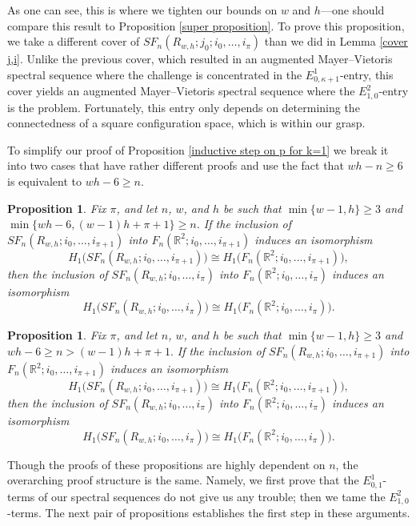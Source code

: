 \documentclass[pagebackref,colorlinks,citecolor=blue,linkcolor=blue,urlcolor=blue,filecolor=blue]{article}
\newtheorem{prop}[thm]{Proposition}
\theoremstyle{definition}\newtheorem{definition}[thm]{Definition}
\theoremstyle{definition}
\newcommand{\R}{\ensuremath{\mathbb{R}}}
\begin{document}
As one can see, this is where we tighten our bounds on $w$ and $h$---one should compare this result to Proposition \ref{super proposition}.
To prove this proposition, we take a different cover of $SF_{n}(R_{w,h}; j_{0}; i_{0}, \dots, i_{\pi})$ than we did in Lemma \ref{cover j,i}.
Unlike the previous cover, which resulted in an augmented Mayer--Vietoris spectral sequence where the challenge is concentrated in the $E^{1}_{0,\kappa+1}$-entry, this cover yields an augmented Mayer--Vietoris spectral sequence where the $E^{2}_{1,0}$-entry is the problem.
Fortunately, this entry only depends on determining the connectedness of a square configuration space, which is within our grasp. 

To simplify our proof of Proposition \ref{inductive step on p for k=1} we break it into two cases that have rather different proofs and use the fact that $wh-n\ge 6$ is equivalent to $wh-6\ge n$.

\begin{prop}\label{inductive step on p for k=1 and n small}
Fix $\pi$, and let $n$, $w$, and $h$ be such that $\min\{w-1,h\}\ge 3$ and $\min\big\{wh-6, (w-1)h+\pi+1\big\}\ge n$.
If the inclusion of $SF_{n}(R_{w,h}; i_{0},\dots, i_{\pi+1})$ into $F_{n}(\R^{2}; i_{0},\dots, i_{\pi+1})$ induces an isomorphism 
\[
H_{1}\big(SF_{n}(R_{w,h}; i_{0},\dots, i_{\pi+1})\big)\cong H_{1}\big(F_{n}(\R^{2}; i_{0},\dots, i_{\pi+1})\big),
\]
then the inclusion of $SF_{n}(R_{w,h}; i_{0},\dots, i_{\pi})$ into $F_{n}(\R^{2}; i_{0},\dots, i_{\pi})$ induces an isomorphism 
\[
H_{1}\big(SF_{n}(R_{w,h}; i_{0},\dots, i_{\pi})\big)\cong H_{1}\big(F_{n}(\R^{2}; i_{0},\dots, i_{\pi})\big).
\]
\end{prop}

\begin{prop}\label{inductive step on p for k=1 and n large}
Fix $\pi$, and let $n$, $w$, and $h$ be such that $\min\{w-1,h\}\ge 3$ and $wh-6\ge n>(w-1)h+\pi+1.$
If the inclusion of $SF_{n}(R_{w,h}; i_{0},\dots, i_{\pi+1})$ into $F_{n}(\R^{2}; i_{0},\dots, i_{\pi+1})$ induces an isomorphism 
\[
H_{1}\big(SF_{n}(R_{w,h}; i_{0},\dots, i_{\pi+1})\big)\cong H_{1}\big(F_{n}(\R^{2}; i_{0},\dots, i_{\pi+1})\big),
\]
then the inclusion of $SF_{n}(R_{w,h}; i_{0},\dots, i_{\pi})$ into $F_{n}(\R^{2}; i_{0},\dots, i_{\pi})$ induces an isomorphism 
\[
H_{1}\big(SF_{n}(R_{w,h}; i_{0},\dots, i_{\pi})\big)\cong H_{1}\big(F_{n}(\R^{2}; i_{0},\dots, i_{\pi})\big).
\]
\end{prop}

Though the proofs of these propositions are highly dependent on $n$, the overarching proof structure is the same.
Namely, we first prove that the $E^{1}_{0,1}$-terms of our spectral sequences do not give us any trouble; then we tame the $E^{2}_{1,0}$-terms.
The next pair of propositions establishes the first step in these arguments.
\end{document}
